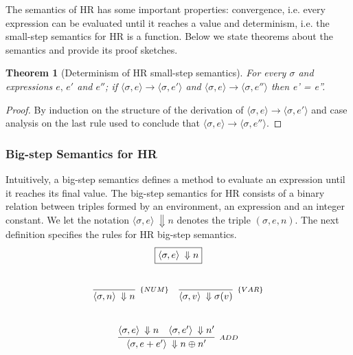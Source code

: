 \documentclass[oneside,12pt]{scrbook}
\newtheorem{Theorem}{Theorem}
\theoremstyle{definition}
\theoremstyle{plain}
\theoremstyle{definition}
\begin{document}
The semantics of HR has some important properties: convergence, i.e. every expression can be evaluated
until it reaches a value and determinism, i.e. the small-step semantics for HR is a function. Below we
state theorems about the semantics and provide its proof sketches.

\begin{Theorem}[Determinism of HR small-step semantics]
	For every $\sigma$ and expressions $e,\,e'$ and $e''$; if
	$\langle \sigma, e\rangle \to \langle \sigma, e'\rangle$ and
	$\langle \sigma, e\rangle \to \langle \sigma, e''\rangle$ then
	e' = e''.
\end{Theorem}
\begin{proof}
	By induction on the structure of the derivation of $\langle \sigma, e\rangle \to \langle \sigma, e'\rangle$ and
	case analysis on the last rule used to conclude that $\langle \sigma, e\rangle \to \langle \sigma, e''\rangle$.
\end{proof}


\subsubsection{Big-step Semantics for HR}\label{subsubsection:big-step}

Intuitively, a big-step semantics defines a method to evaluate an expression until it reaches its final value.
The big-step semantics for HR consists of a binary relation between triples formed by an environment, an
expression and an integer constant. We let the notation $\langle \sigma, e \rangle\:\Downarrow n$ denotes the
triple $(\sigma, e, n)$. The next definition specifies the rules for HR big-step semantics.
\[
\begin{array}{c}
\fbox{$\langle \sigma, e \rangle\:\Downarrow n$} \\ \\ \\
\begin{array}{cc}
\infer[_{\{NUM\}}]
{\langle \sigma, n \rangle\:\Downarrow n}{} &
\infer[_{\{VAR\}}]
{\langle \sigma, v \rangle\:\Downarrow \sigma(v)}{} \\ \\ \\
\multicolumn{2}{c}{
	\infer[_{ADD}]
	{\langle \sigma, e + e' \rangle\:\Downarrow n \oplus n'}
	{\langle \sigma, e \rangle\:\Downarrow n &
		\langle \sigma, e' \rangle\:\Downarrow n'}
}
\end{array}
\end{array}
\]
\end{document}
